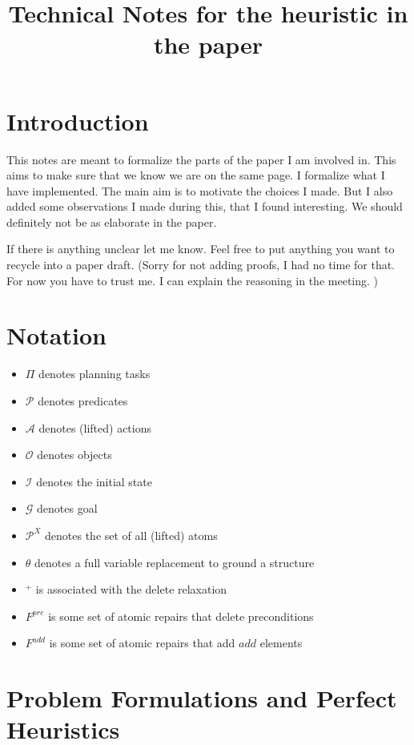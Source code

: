 \documentclass[twocolumn]{article}
\title{Technical Notes for the heuristic in the paper}
\newcommand{\task}{\ensuremath{\Pi}\xspace}
\newcommand{\preds}{\ensuremath{\mathcal{P}}\xspace}
\newcommand{\acts}{\ensuremath{\mathcal{A}}\xspace}
\newcommand{\objects}{\ensuremath{\mathcal{O}}\xspace}
\newcommand{\init}{\ensuremath{\mathcal{I}}\xspace}
\newcommand{\goal}{\ensuremath{\mathcal{G}}\xspace}
\newcommand{\vars}{\ensuremath{X}\xspace}
\newcommand{\varRepl}{\ensuremath{\theta}\xspace}
\newcommand{\atoms}{\ensuremath{\preds^{\vars}}\xspace}
\newcommand{\prename}{\ensuremath{pre}\xspace}
\newcommand{\addname}{\ensuremath{add}\xspace}
\newcommand{\fixPre}{\ensuremath{F^{\prename}}\xspace}
\newcommand{\fixAdd}{\ensuremath{F^{\addname}}\xspace}
\begin{document}
	
	\maketitle
	
	\section{Introduction}
	
	This notes are meant to formalize the parts of the paper I am involved in.
	This aims to make sure that we know we are on the same page.
	I formalize what I have implemented.
	The main aim is to motivate the choices I made.
	But I also added  some observations I made during this, that I found interesting. 
	We should definitely not be as elaborate in the paper.
	
	
	If there is anything unclear let me know. 
	Feel free to put anything you want to recycle into a paper draft.
	(Sorry for not adding proofs, I had no time for that.
	For now you have to trust me.
	I can explain the reasoning in the meeting.
	)
	
	\section{Notation}
	
	\begin{itemize}[noitemsep]
		\item \task denotes planning tasks
		\item \preds denotes predicates
		\item \acts denotes (lifted) actions
		\item \objects denotes objects
		\item \init denotes the initial state
		\item \goal denotes goal
		\item \atoms denotes the set of all (lifted) atoms
		\item \varRepl denotes a full variable replacement to ground a structure
		\item $^+$ is associated with the delete relaxation
		\item \fixPre is some set of atomic repairs that delete preconditions
		\item \fixAdd is some set of atomic repairs that add \addname elements
	\end{itemize}
	
	
	\section{Problem Formulations and Perfect Heuristics}
	
\end{document}
